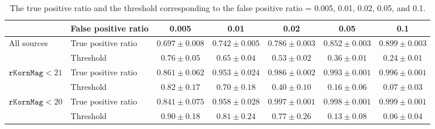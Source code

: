 \documentclass[twocolumn]{aastex62}
\begin{document}
\begin{table}
\begin{center}
\caption{The true positive ratio and the threshold 
corresponding to the false positive ratio = 0.005, 0.01, 0.02, 0.05, and 0.1. }
\label{tbl:fpr}
\begin{tabular}{llccccc}
\hline\hline
                                                 & False positive ratio & 0.005 & 0.01 & 0.02 & 0.05 & 0.1 \\ \hline
\multicolumn{1}{l}{\multirow{2}{*}{All sources}} & True positive ratio  & $0.697 \pm 0.008$ &  $0.742 \pm 0.005$ & $0.786 \pm 0.003$ & $0.852 \pm 0.003$ & $0.899 \pm 0.003$  \\
\multicolumn{1}{l}{}                             & Threshold & $0.76 \pm 0.05$ &  $0.65 \pm 0.04$ & $0.53 \pm 0.02$ & $0.36 \pm 0.01$ & $0.24 \pm 0.01$  \\ \hline
\multirow{2}{*}{$\mathtt{rKornMag} < 21$} & True positive ratio  & $0.861 \pm 0.062$ &  $0.953 \pm 0.024$ & $0.986 \pm 0.002$ & $0.993 \pm 0.001$ & $0.996 \pm 0.001$ \\
                                                 & Threshold & $0.82 \pm 0.17$ &  $0.70 \pm 0.18$ & $0.40 \pm 0.10$ & $0.16 \pm 0.06$ & $0.07 \pm 0.03$   \\ \hline
\multirow{2}{*}{$\mathtt{rKornMag} < 20$}  & True positive ratio  & $0.841 \pm 0.075$ &  $0.958 \pm 0.028$ & $0.997 \pm 0.001$ & $0.998 \pm 0.001$ & $0.999 \pm 0.001$  \\
                                                  & Threshold & $0.90 \pm 0.18$ &  $0.81 \pm 0.24$ & $0.77 \pm 0.26$ & $0.13 \pm 0.08$ & $0.06 \pm 0.04$ \\ \hline
\end{tabular}
\end{center}
\end{table}
\end{document}
